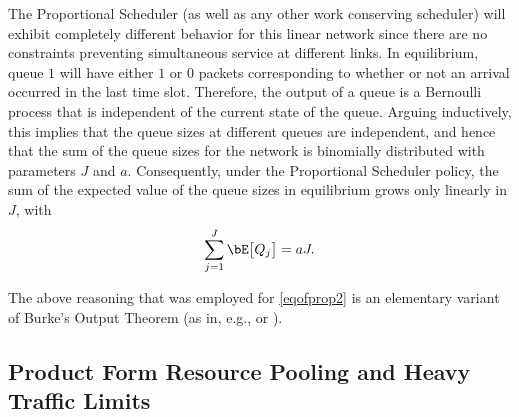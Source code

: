 \documentclass{amsart}
\newtheorem{proposition}{Proposition}
\begin{document}
The Proportional Scheduler  (as well as any other work conserving scheduler)  will exhibit completely different behavior for this linear network since there are no constraints preventing simultaneous service at different links. In equilibrium, queue $1$ will have either $1$ or $0$ packets corresponding to whether or not an arrival occurred in the last time slot. Therefore, the output of a queue is a Bernoulli process that is independent of the current state of the queue. Arguing inductively, this implies that the queue sizes at different queues are independent, and hence that the sum of the queue sizes for the network is binomially distributed with parameters $J$ and $a$. Consequently, under the Proportional Scheduler policy, the sum of the expected value of the queue sizes in equilibrium grows only linearly in $J$, with
\begin{equation}\label{eqofprop2}
\sum_{j=1}^J \bE \big[Q_j \big]   = a J .
\end{equation}
\iffalse
\begin{proposition}\label{pr:linear.network.PF}
In a linear network with $J$ links, if each link is subcritically loaded, then, under the Proportional Scheduler policy, the total queue size of the network in equilibrium grows only linearly with $J$, i.e.,
\begin{equation*}
\sum_{j=1}^J \bE \big[Q_j \big]   \leq c \, J 
\end{equation*}
for some constant $c>0$ not depending on $J$.
\end{proposition}
\fi

The above reasoning that was employed for \eqref{eqofprop2} is an elementary variant of Burke's Output Theorem (as in, e.g., \cite{Bu56} or \cite{HsBu76}). 

\iffalse
The argument can be briefly sketched as follows: The queues in the linear network behave like birth-death processes and hence are reversible. 
Since arrivals at the first queue occur according to a Bernoulli process that is independent of the current state, reversibility implies that the output process of this queue is again an independent Bernoulli process.
By induction, this will imply that, in equilibrium, each queue behaves independently of the others, which will prevent individual queues from growing. 
\fi

\iffalse
\subsection{Product Form Resource Pooling and Heavy Traffic Limits} \label{ProdFormResPooling}
\end{document}
